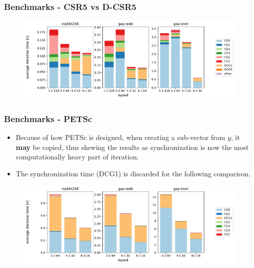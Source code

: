 \documentclass{beamer}
\begin{document}
\begin{frame}
    \frametitle{Benchmarks - CSR5 vs D-CSR5}
    \begin{figure}[htp]
        \centering
        \includegraphics[scale=0.45]{static/mpi.pdf}
    \end{figure}
    \centering
\end{frame}

\begin{frame}
    \frametitle{Benchmarks - PETSc}
    \begin{itemize}
        \item Because of how PETSc is designed, when creating a sub-vector from $y$, it \textbf{may} be copied, thus
              skewing the results as synchronization is now the most computationally heavy part of iteration.
        \item The synchronization time (DCG1) is discarded for the following comparison.
    \end{itemize}
    \begin{figure}[htp]
        \centering
        \includegraphics[scale=0.45]{static/petsc_mpi.pdf}
    \end{figure}
\end{frame}
\end{document}
